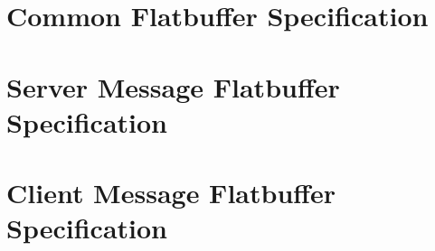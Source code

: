 \documentclass[11pt, oneside]{amsart}
\begin{document}
\appendix

\section{Common Flatbuffer Specification}



\section{Server Message Flatbuffer Specification}


\section{Client Message Flatbuffer Specification}

\end{document}
